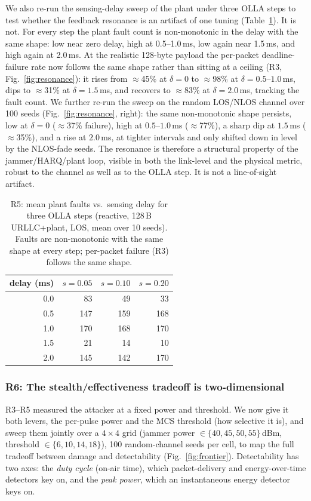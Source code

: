 \documentclass[conference]{IEEEtran}
\begin{document}
We also re-run the sensing-delay sweep of the plant under three OLLA steps to test
whether the feedback resonance is an artifact of one tuning (Table~\ref{tab:r5b}). It is
not. For every step the plant fault count is non-monotonic in the delay with the same
shape: low near zero delay, high at 0.5--1.0\,ms, low again near 1.5\,ms, and high again
at 2.0\,ms. At the realistic 128-byte payload the per-packet deadline-failure rate now
follows the same shape rather than sitting at a ceiling (R3, Fig.~\ref{fig:resonance}):
it rises from $\approx$45\% at $\delta=0$ to $\approx$98\% at $\delta=0.5$--$1.0$\,ms,
dips to $\approx$31\% at $\delta=1.5$\,ms, and recovers to $\approx$83\% at $\delta=2.0$\,ms,
tracking the fault count. We further re-run the sweep on the random LOS/NLOS channel over
100 seeds (Fig.~\ref{fig:resonance}, right): the same non-monotonic shape persists, low at
$\delta=0$ ($\approx$37\% failure), high at $0.5$--$1.0$\,ms ($\approx$77\%), a sharp dip
at $1.5$\,ms ($\approx$35\%), and a rise at $2.0$\,ms, at tighter intervals and only
shifted down in level by the NLOS-fade seeds. The resonance is therefore a structural
property of the jammer/HARQ/plant loop, visible in both the link-level and the physical
metric, robust to the channel as well as to the OLLA step. It is not a line-of-sight
artifact.

\begin{table}[t]\centering
\caption{R5: mean plant faults vs.\ sensing delay for three OLLA steps (reactive,
128\,B URLLC+plant, LOS, mean over 10 seeds). Faults are non-monotonic with the same shape
at every step; per-packet failure (R3) follows the same shape.}
\label{tab:r5b}
\begin{tabular}{rrrr}\toprule
delay (ms) & $s{=}0.05$ & $s{=}0.10$ & $s{=}0.20$ \\\midrule
0.0 & 83  & 49  & 33  \\
0.5 & 147 & 159 & 168 \\
1.0 & 170 & 168 & 170 \\
1.5 & 21  & 14  & 10  \\
2.0 & 145 & 142 & 170 \\\bottomrule
\end{tabular}\end{table}

\subsubsection*{R6: The stealth/effectiveness tradeoff is two-dimensional}
R3--R5 measured the attacker at a fixed power and threshold. We now give it both levers,
the per-pulse power and the MCS threshold (how selective it is), and sweep them
jointly over a $4\times4$ grid (jammer power $\in\{40,45,50,55\}$\,dBm, threshold
$\in\{6,10,14,18\}$), 100 random-channel seeds per cell, to map the full tradeoff between
damage and detectability (Fig.~\ref{fig:frontier}). Detectability has two axes: the
\emph{duty cycle} (on-air time), which packet-delivery and energy-over-time detectors key
on, and the \emph{peak power}, which an instantaneous energy detector keys on.
\end{document}
